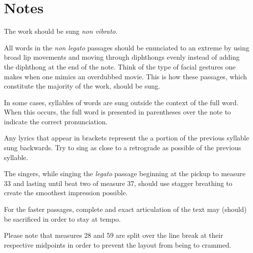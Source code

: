 \documentclass[letterpaper]{book}
\begin{document}
\section*{Notes}
The work should be sung \emph{non vibrato}.\par
All words in the \emph{non legato} passages should be enunciated to an extreme by using broad lip movements and moving through diphthongs evenly instead of adding the diphthong at the end of the note.  Think of the type of facial gestures one makes when one mimics an overdubbed movie.  This is how these passages, which constitute the majority of the work, should be sung.\par
In some cases, syllables of words are sung outside the context of the full word.  When this occurs, the full word is presented in parentheses over the note to indicate the correct pronunciation.\par
Any lyrics that appear in brackets represent the a portion of the previous syllable sung backwards.  Try to sing as close to a retrograde as possible of the previous syllable.\par
The singers, while singing the \emph{legato} passage beginning at the pickup to measure 33 and lasting until beat two of measure 37, should use stagger breathing to create the smoothest impression possible.\par
For the faster passages, complete and exact articulation of the text may (should) be sacrificed in order to stay at tempo.\par
Please note that measures 28 and 59 are split over the line break at their respective midpoints in order to prevent the layout from being to crammed.
\end{document}
